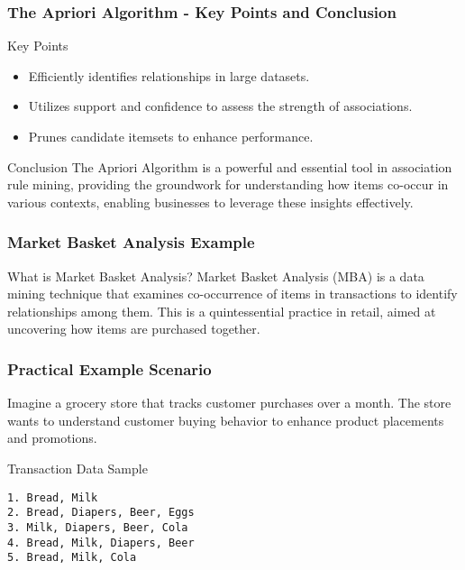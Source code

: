 \documentclass{beamer}
\begin{document}
\begin{frame}[fragile]
    \frametitle{The Apriori Algorithm - Key Points and Conclusion}
    \begin{block}{Key Points}
        \begin{itemize}
            \item Efficiently identifies relationships in large datasets.
            \item Utilizes support and confidence to assess the strength of associations.
            \item Prunes candidate itemsets to enhance performance.
        \end{itemize}
    \end{block}
    
    \begin{block}{Conclusion}
        The Apriori Algorithm is a powerful and essential tool in association rule mining, providing the groundwork for understanding how items co-occur in various contexts, enabling businesses to leverage these insights effectively.
    \end{block}
\end{frame}

\begin{frame}[fragile]
    \frametitle{Market Basket Analysis Example}
    \begin{block}{What is Market Basket Analysis?}
        Market Basket Analysis (MBA) is a data mining technique that examines co-occurrence of items in transactions to identify relationships among them. This is a quintessential practice in retail, aimed at uncovering how items are purchased together.
    \end{block}
\end{frame}

\begin{frame}[fragile]
    \frametitle{Practical Example Scenario}
    Imagine a grocery store that tracks customer purchases over a month. The store wants to understand customer buying behavior to enhance product placements and promotions.
    
    \begin{block}{Transaction Data Sample}
    \begin{verbatim}
1. Bread, Milk
2. Bread, Diapers, Beer, Eggs
3. Milk, Diapers, Beer, Cola
4. Bread, Milk, Diapers, Beer
5. Bread, Milk, Cola
    \end{verbatim}
    \end{block}
\end{frame}
\end{document}
